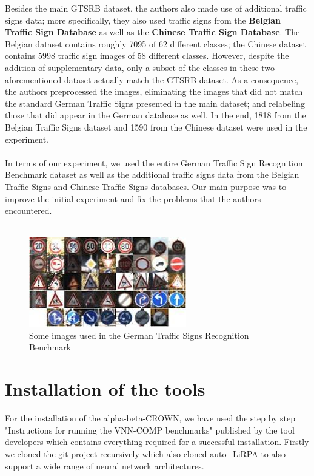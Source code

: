\documentclass[12pt,a4paper]{report}
\newcommand\tab[1][5mm]{\hspace*{#1}}
\begin{document}
Besides the main GTSRB dataset, the authors also made use of additional traffic signs data; more specifically, they also used traffic signs from the \textbf{Belgian Traffic Sign Database} as well as the \textbf{Chinese Traffic Sign Database}. The Belgian dataset contains roughly 7095 of 62 different classes; the Chinese dataset contains 5998 traffic sign images of 58 different classes. However, despite the addition of supplementary data, only a subset of the classes in these two aforementioned dataset actually match the GTSRB dataset. As a consequence, the authors preprocessed the images, eliminating the images that did not match the standard German Traffic Signs presented in the main dataset; and relabeling those that did appear in the German database as well. In the end, 1818 from the Belgian Traffic Signs dataset and 1590 from the Chinese dataset were used in the experiment.\\\\
In terms of our experiment, we used the entire German Traffic Sign Recognition Benchmark dataset as well as the additional traffic signs data from the Belgian Traffic Signs and Chinese Traffic Signs databases. Our main purpose was to improve the initial experiment and fix the problems that the authors encountered. \\\\

\begin{figure}[h]
\centering
\includegraphics[scale=0.8]{figure2.jpg}
\caption{Some images used in the German Traffic Signs Recognition Benchmark}
\end{figure}

\chapter{Installation of the tools}
\tab For the installation of the alpha-beta-CROWN, we have used the step by step "Instructions for running the VNN-COMP benchmarks"\cite{alpha-beta-instructions} published by the tool developers which contains everything required for a successful installation. Firstly we cloned the git project recursively which also cloned auto\_LiRPA\cite{auto_lirpa_repo} to also support a wide range of neural network architectures.
\end{document}
